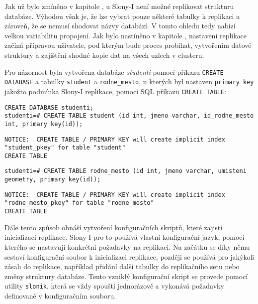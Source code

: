 
Jak už bylo zmíněno v kapitole , u Slony-I není možné replikovat strukturu databáze. Výhodou však je, že lze vybrat pouze některé tabulky k replikaci a zároveň, že se nemusí shodovat názvy databází. V tomto ohledu tedy nabízí velkou variabilitu propojení. Jak bylo nastíněno v kapitole , nastavení replikace začíná přípravou uživatele, pod kterým bude proces probíhat, vytvořením datové struktury a zajištění shodné kopie dat na všech uzlech v clusteru.

Pro názornost byla vytvořena databáze {\it studenti} pomocí příkazu \texttt{CREATE DATABASE} a  tabulky \texttt{student} a \texttt{rodne\_mesto}, u kterých byl nastaven \texttt{primary key} jakožto podmínka Slony-I replikace, pomocí SQL příkazu \texttt{CREATE TABLE}:

\begin{lstlisting}
CREATE DATABASE studenti;
studenti=# CREATE TABLE student (id int, jmeno varchar, id_rodne_mesto int, primary key(id));
\end{lstlisting}
\begin{lstlisting}[keywordstyle=\color{black},identifierstyle=\color{black},stringstyle=\color{black}]
NOTICE:  CREATE TABLE / PRIMARY KEY will create implicit index "student_pkey" for table "student"
CREATE TABLE
\end{lstlisting}
\begin{lstlisting}
studenti=# CREATE TABLE rodne_mesto (id int, jmeno varchar, umisteni geometry, primary key(id));
\end{lstlisting}
\begin{lstlisting}[keywordstyle=\color{black},identifierstyle=\color{black},stringstyle=\color{black}]
NOTICE:  CREATE TABLE / PRIMARY KEY will create implicit index "rodne_mesto_pkey" for table "rodne_mesto"
CREATE TABLE
\end{lstlisting}

Dále tento způsob obnáší vytvoření konfiguračních skriptů, které zajistí inicializaci replikace. Slony-I pro to používá vlastní konfigurační jazyk, pomocí kterého se nastavují konkrétní požadavky na replikaci. Na začátku se díky němu sestaví konfigurační soubor k inicializaci replikace, později se používá pro jakýkoli zásah do replikace, například přidání další tabulky do replikačního setu nebo změny struktury databáze. Tento vzniklý konfigurační skript se provede pomocí utility \texttt{slonik}, která se vždy spouští jednorázově a vykonává požadavky definované v konfiguračním souboru. 


